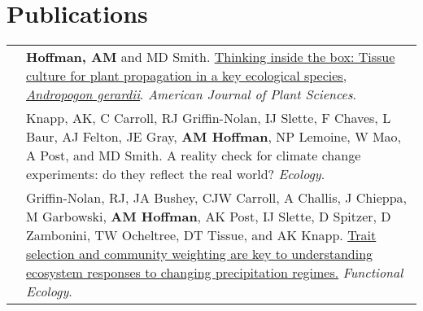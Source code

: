 \documentclass[letterpaper]{deedy-resume} %
\begin{document}

\section{Publications}
\begin{tabular}{>{\raggedleft\arraybackslash}p{2cm}p{16cm}}

2018 & \textbf{Hoffman, AM} and MD Smith. \href{https://www.scirp.org/Journal/PaperInformation.aspx?PaperID=87129}{Thinking inside the box: Tissue culture for plant propagation in a key ecological species, \textit{Andropogon gerardii}}. \textcolor{special}{\textit{American Journal of Plant Sciences}}.\\

2018 & Knapp, AK, C Carroll, RJ Griffin-Nolan, IJ Slette, F Chaves, L Baur, AJ Felton, JE Gray, \textbf{AM Hoffman}, NP Lemoine, W Mao, A Post, and MD Smith. A reality check for climate change experiments: do they reflect the real world? \textcolor{special}{\textit{Ecology}}. \\

2018 & Griffin-Nolan, RJ, JA Bushey, CJW Carroll, A Challis, J Chieppa, M Garbowski, \textbf{AM Hoffman}, AK Post, IJ Slette, D Spitzer, D Zambonini, TW Ocheltree, DT Tissue, and AK Knapp. \href{https://besjournals.onlinelibrary.wiley.com/doi/abs/10.1111/1365-2435.13135}{Trait selection and community weighting are key to understanding ecosystem responses to changing precipitation regimes.} \textcolor{special}{\textit{Functional Ecology}}.\\

\end{tabular}
\end{document}

